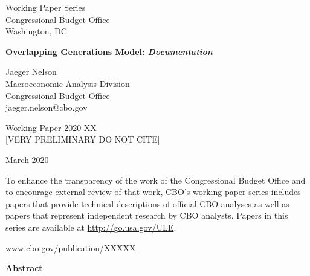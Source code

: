 \documentclass[11pt,leqno,fleqn]{article}
\begin{document}
\pagestyle{empty}

\begin{center}
Working Paper Series\\
Congressional Budget Office\\
Washington, DC\vspace{0.75in}

\textbf{\Large Overlapping Generations Model: \textit{Documentation}}

\vspace{5em}

Jaeger Nelson\\
Macroeconomic Analysis Division\\
Congressional Budget Office\\
jaeger.nelson@cbo.gov

\vspace{5em}

Working Paper 2020-XX\\

\vspace{2em}
\Large [VERY PRELIMINARY DO NOT CITE]\\
\vspace{2em}
\normalsize

March 2020\\

\end{center}

\vspace*{\fill}

\begin{flushleft}
	\small To enhance the transparency of the work of the Congressional Budget Office and to encourage external review of that work, CBO's working paper series includes papers that provide technical descriptions of official CBO analyses as well as papers that represent independent research by CBO analysts. Papers in this series are available at \url{http://go.usa.gov/ULE}.
\end{flushleft}

\vspace{2em}

\begin{center}
	\url{www.cbo.gov/publication/XXXXX}
\end{center}




\newpage

\begin{center}
\textbf{Abstract}\\
\end{center}
\end{document}
